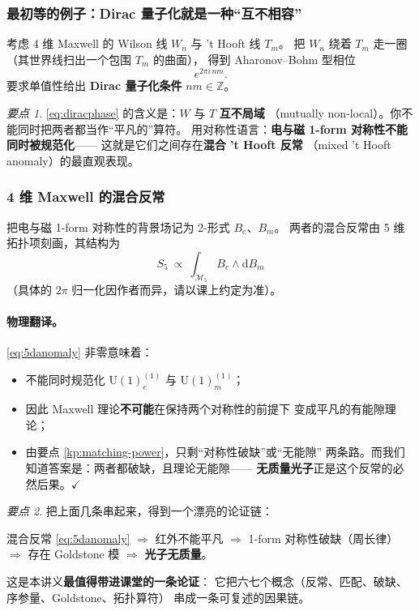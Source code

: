 \documentclass[UTF8,a4paper,11pt]{ctexart}
\theoremstyle{plain}
\theoremstyle{definition}
\theoremstyle{remark}
\newtheorem{keypoint}{要点}[section]
\newcommand{\ext}{\mathrm{d}}          %
\newcommand{\ZZ}{\mathbb{Z}}
\newcommand{\Uone}{\mathrm{U}(1)}
\newcommand{\Mfd}{\mathcal{M}}
\newcommand{\en}[1]{\textsf{#1}}       %
\begin{document}
\subsubsection{最初等的例子：Dirac 量子化就是一种“互不相容”}

考虑 4 维 Maxwell 的 Wilson 线 $W_n$ 与 't Hooft 线 $T_m$。
把 $W_n$ 绕着 $T_m$ 走一圈（其世界线扫出一个包围 $T_m$ 的曲面），
得到 Aharonov--Bohm 型相位
\begin{equation}
  e^{2\pi i\,n m} .
  \label{eq:diracphase}
\end{equation}
要求单值性给出 \textbf{Dirac 量子化条件} $nm\in\ZZ$。

\begin{keypoint}
\label{kp:mutual}
\eqref{eq:diracphase} 的含义是：$W$ 与 $T$ \textbf{互不局域}
（\en{mutually non-local}）。你不能同时把两者都当作“平凡的”算符。
用对称性语言：\textbf{电与磁 1-form 对称性不能同时被规范化}——
这就是它们之间存在\textbf{混合 't Hooft 反常}
（\en{mixed 't Hooft anomaly}）的最直观表现。
\end{keypoint}

\subsubsection{4 维 Maxwell 的混合反常}

把电与磁 1-form 对称性的背景场记为 2-形式 $B_e$、$B_m$。
两者的混合反常由 5 维拓扑项刻画，其结构为
\begin{equation}
  S_5\ \propto\ \int_{\Mfd_5} B_e\wedge \ext B_m
  \label{eq:5danomaly}
\end{equation}
（具体的 $2\pi$ 归一化因作者而异，请以课上约定为准）。

\paragraph{物理翻译。}\eqref{eq:5danomaly} 非零意味着：
\begin{itemize}
  \item 不能同时规范化 $\Uone_e^{(1)}$ 与 $\Uone_m^{(1)}$；
  \item 因此 Maxwell 理论\textbf{不可能}在保持两个对称性的前提下
        变成平凡的有能隙理论；
  \item 由要点 \ref{kp:matching-power}，只剩“对称性破缺”或“无能隙”
        两条路。而我们知道答案是：两者都破缺，且理论无能隙——
        \textbf{无质量光子}正是这个反常的必然后果。$\checkmark$
\end{itemize}

\begin{keypoint}
\label{kp:photon-explained}
把上面几条串起来，得到一个漂亮的论证链：
\begin{center}
混合反常 \eqref{eq:5danomaly} $\Rightarrow$
红外不能平凡 $\Rightarrow$
1-form 对称性破缺（周长律）$\Rightarrow$
存在 Goldstone 模 $\Rightarrow$
\textbf{光子无质量}。
\end{center}
这是本讲义\textbf{最值得带进课堂的一条论证}：
它把六七个概念（反常、匹配、破缺、序参量、Goldstone、拓扑算符）
串成一条可复述的因果链。
\end{keypoint}
\end{document}
